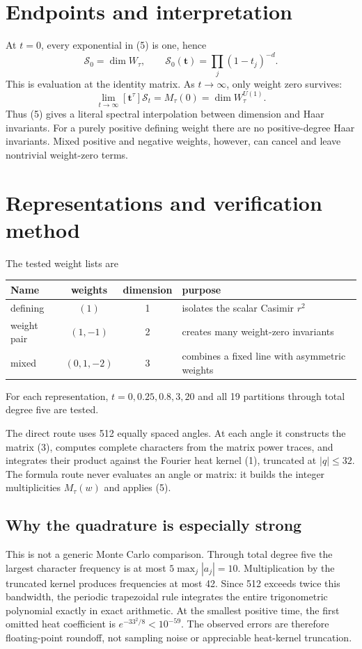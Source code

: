 \documentclass[10pt]{article}
\newcommand{\Sfun}{\mathcal S}
\begin{document}
\section{Endpoints and interpretation}
At $t=0$, every exponential in (5) is one, hence
\begin{equation}
[\mathbf t^\tau]\Sfun_0=\dim W_\tau,
\qquad
\Sfun_0(\mathbf t)=\prod_j(1-t_j)^{-d}.                    \tag{6}
\end{equation}
This is evaluation at the identity matrix.  As $t\to\infty$, only weight zero
survives:
\begin{equation}
\lim_{t\to\infty}[\mathbf t^\tau]\Sfun_t=M_\tau(0)
=\dim W_\tau^{U(1)}.                                       \tag{7}
\end{equation}
Thus (5) gives a literal spectral interpolation between dimension and Haar
invariants.  For a purely positive defining weight there are no positive-degree
Haar invariants.  Mixed positive and negative weights, however, can cancel and
leave nontrivial weight-zero terms.

\section{Representations and verification method}
The tested weight lists are
\begin{center}
\begin{tabular}{@{}lccp{7.1cm}@{}}
\toprule
Name & weights & dimension & purpose\\
\midrule
defining & $(1)$ & 1 & isolates the scalar Casimir $r^2$\\
weight pair & $(1,-1)$ & 2 & creates many weight-zero invariants\\
mixed & $(0,1,-2)$ & 3 & combines a fixed line with asymmetric weights\\
\bottomrule
\end{tabular}
\end{center}
For each representation, $t=0,0.25,0.8,3,20$ and all 19 partitions through
total degree five are tested.

The direct route uses 512 equally spaced angles.  At each angle it constructs
the matrix (3), computes complete characters from the matrix power traces, and
integrates their product against the Fourier heat kernel (1), truncated at
$|q|\leq32$.  The formula route never evaluates an angle or matrix: it builds
the integer multiplicities $M_\tau(w)$ and applies (5).

\subsection*{Why the quadrature is especially strong}
This is not a generic Monte Carlo comparison.  Through total degree five the
largest character frequency is at most $5\max_j|a_j|=10$.  Multiplication by
the truncated kernel produces frequencies at most 42.  Since 512 exceeds
twice this bandwidth, the periodic trapezoidal rule integrates the entire
trigonometric polynomial exactly in exact arithmetic.  At the smallest
positive time, the first omitted heat coefficient is
$e^{-33^2/8}<10^{-59}$.  The observed errors are therefore floating-point
roundoff, not sampling noise or appreciable heat-kernel truncation.
\end{document}
